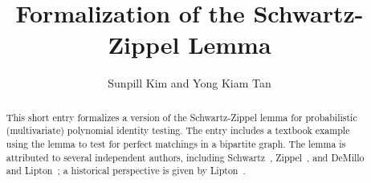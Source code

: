 \documentclass[11pt,a4paper]{article}
\begin{document}
\title{Formalization of the Schwartz-Zippel Lemma}
\author{Sunpill Kim and Yong Kiam Tan}
\maketitle
\begin{abstract}
This short entry formalizes a version of the Schwartz-Zippel lemma for probabilistic (multivariate) polynomial identity testing.
The entry includes a textbook example using the lemma to test for perfect matchings in a bipartite graph.
The lemma is attributed to several independent authors, including Schwartz~\cite{DBLP:journals/jacm/Schwartz80}, Zippel~\cite{DBLP:conf/eurosam/Zippel79}, and DeMillo and Lipton~\cite{DBLP:journals/ipl/DemilloL78}; a historical perspective is given by Lipton~\cite{history}.
\end{abstract}

\tableofcontents




\end{document}
